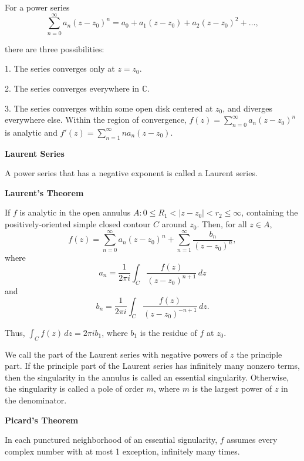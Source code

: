 \documentclass{article}
\begin{document}
    For a power series $$\sum_{n=0}^\infty a_n(z-z_0)^n = a_0 + a_1(z-z_0) + a_2(z-z_0)^2 + \hdots,$$

    there are three possibilities:

    1. The series converges only at $z=z_0$.

    2. The series converges everywhere in $\mathbb C$.

    3. The series converges within some open disk centered at $z_0$, and diverges everywhere else.
    Within the region of convergence, $f(z) = \sum_{n=0}^\infty a_n(z-z_0)^n$ is analytic and $f'(z) = \sum_{n=1}^\infty na_n(z-z_0)$.

\medskip\noindent\textbf{Laurent Series}

    A power series that has a negative exponent is called a Laurent series.

\medskip\noindent\textbf{Laurent's Theorem}

    If $f$ is analytic in the open annulus $A: 0 \leq R_1 < |z-z_0| < r_2 \leq \infty$, containing the positively-oriented simple closed contour $C$ around $z_0$.
     Then, for all $z \in A$, $$f(z) = \sum_{n=0}^\infty a_n(z-z_0)^n + \sum_{n=1}^\infty \frac{b_n}{(z-z_0)^n},$$
    where $$a_n = \frac1{2\pi i} \int_{C} \frac{f(z)}{(z-z_0)^{n+1}}\,dz$$ and $$b_n=\frac{1}{2\pi i} \int_C\frac{f(z)}{(z-z_0)^{-n+1}}\,dz.$$

    Thus, $\int_C f(z) \,dz = 2\pi i b_1$, where $b_1$ is the residue of $f$ at $z_0$.

    We call the part of the Laurent series with negative powers of $z$ the principle part.
    If the principle part of the Laurent series has infinitely many nonzero terms, then the singularity in the annulus is called an essential singularity.
    Otherwise, the singularity is called a pole of order $m$, where $m$ is the largest power of $z$ in the denominator.

\medskip\noindent\textbf{Picard's Theorem}

    In each punctured neighborhood of an essential signularity, $f$ assumes every complex number with at most 1 exception, infinitely many times.
     
\end{document}
